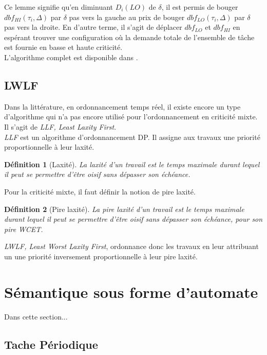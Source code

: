 \documentclass[12pt,a4paper,oneside]{book}
\theoremstyle{break}
\newtheorem{defin}{Définition}[chapter]
\theoremstyle{breakplain}
\begin{document}
Ce lemme signifie qu'en diminuant $D_i(LO)$ de $\delta$, il est permis de bouger $dbf_{HI}(\tau_i, \Delta)$ par $\delta$ pas vers la gauche au prix de bouger $dbf_{LO}(\tau_i, \Delta)$ par $\delta$ pas vers la droite. En d'autre terme, il s'agit de déplacer $dbf_{LO}$ et $dbf_{HI}$ en espérant trouver une configuration où la demande totale de l'ensemble de tâche est fournie en basse et haute criticité.\\

L'algorithme complet est disponible dans \cite{ekberg2012outstanding}.

\section{LWLF}
Dans la littérature, en ordonnancement temps réel, il existe encore un type d'algorithme qui n'a pas encore utilisé pour l'ordonnancement en criticité mixte. Il s'agit de \textit{LLF, Least Laxity First}.\\

\textit{LLF} est un algorithme d'ordonnancement DP. Il assigne aux travaux une priorité proportionnelle à leur laxité.

\begin{defin}[Laxité\cite{goossens1999scheduling}]
La laxité d'un travail est le temps maximale durant lequel il peut se permettre d'être oisif sans dépasser son échéance.
\end{defin}

Pour la criticité mixte, il faut définir la notion de pire laxité.

\begin{defin}[Pire laxité]
La pire laxité d'un travail est le temps maximale durant lequel il peut se permettre d'être oisif sans dépasser son échéance, pour son pire WCET.
\end{defin}

\textit{LWLF, Least Worst Laxity First}, ordonnance donc les travaux en leur attribuant un une priorité inversement proportionnelle à leur pire laxité.


\chapter{Sémantique sous forme d'automate}

Dans cette section...

\section{Tache Périodique}
\end{document}

